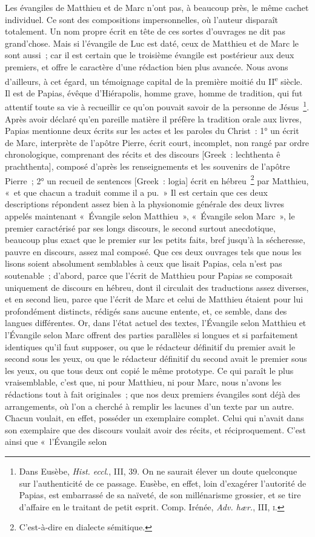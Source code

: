 \documentclass[french,twoside]{book} %
\begin{document}
Les évangiles de Matthieu et de Marc n’ont pas, à beaucoup près, le même cachet individuel. Ce sont des compositions impersonnelles, où l’auteur disparaît totalement. Un nom propre écrit en tête de ces sortes d’ouvrages ne dit pas grand’chose. Mais si l’évangile de Luc est daté, ceux de Matthieu et de Marc le sont aussi ; car il est certain que le troisième évangile est postérieur aux deux premiers, et offre le caractère d’une rédaction bien plus avancée. Nous avons d’ailleurs, à cet égard, un témoignage capital de la première moitié du II\textsuperscript{e} siècle. Il est de Papias, évêque d’Hiérapolis, homme grave, homme de tradition, qui fut attentif toute sa vie à recueillir ce qu’on pouvait savoir de la personne de Jésus \footnote{ Dans Eusèbe, {\itshape Hist. eccl}., III, 39. On ne saurait élever un doute quelconque sur l’authenticité de ce passage. Eusèbe, en effet, loin d’exagérer l’autorité de Papias, est embarrassé de sa naïveté, de son millénarisme grossier, et se tire d’affaire en le traitant de petit esprit. Comp. Irénée, {\itshape Adv. hær.}, III, \textsc{i}.}. Après avoir déclaré qu’en pareille matière il préfère la tradition orale aux livres, Papias mentionne deux écrits sur les actes et les paroles du Christ : 1° un écrit de Marc, interprète de l’apôtre Pierre, écrit court, incomplet, non rangé par ordre chronologique, comprenant des récits et des discours [Greek : lechthenta ê prachthenta], composé d’après les renseignements et les souvenirs de l’apôtre Pierre ; 2° un recueil de sentences [Greek : logia] écrit en hébreu \footnote{C’est-à-dire en dialecte sémitique.} par Matthieu, « et que chacun a traduit comme il a pu. » Il est certain que ces deux descriptions répondent assez bien à la physionomie générale des deux livres appelés maintenant « Évangile selon Matthieu », « Évangile selon Marc », le premier caractérisé par ses longs discours, le second surtout anecdotique, beaucoup plus exact que le premier sur les petits faits, bref jusqu’à la sécheresse, pauvre en discours, assez mal composé. Que ces deux ouvrages tels que nous les lisons soient absolument semblables à ceux que lisait Papias, cela n’est pas soutenable ; d’abord, parce que l’écrit de Matthieu pour Papias se composait uniquement de discours en hébreu, dont il circulait des traductions assez diverses, et en second lieu, parce que l’écrit de Marc et celui de Matthieu étaient pour lui profondément distincts, rédigés sans aucune entente, et, ce semble, dans des langues différentes. Or, dans l’état actuel des textes, l’Évangile selon Matthieu et l’Évangile selon Marc offrent des parties parallèles si longues et si parfaitement identiques qu’il faut supposer, ou que le rédacteur définitif du premier avait le second sous les yeux, ou que le rédacteur définitif du second avait le premier sous les yeux, ou que tous deux ont copié le même prototype. Ce qui paraît le plus vraisemblable, c’est que, ni pour Matthieu, ni pour Marc, nous n’avons les rédactions tout à fait originales ; que nos deux premiers évangiles sont déjà des arrangements, où l’on a cherché à remplir les lacunes d’un texte par un autre. Chacun voulait, en effet, posséder un exemplaire complet. Celui qui n’avait dans son exemplaire que des discours voulait avoir des récits, et réciproquement. C’est ainsi que « l’Évangile selon 
\end{document}
